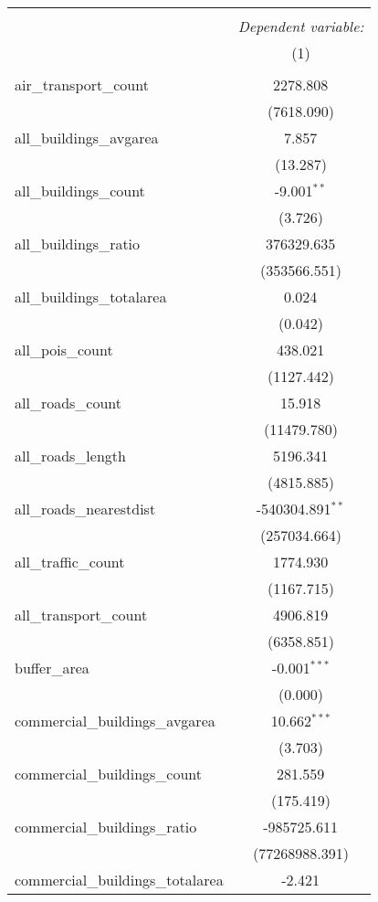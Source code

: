 \begin{table}[!htbp] \centering
\begin{tabular}{@{\extracolsep{5pt}}lc}
\\[-1.8ex]\hline
\hline \\[-1.8ex]
& \multicolumn{1}{c}{\textit{Dependent variable:}} \
\cr \cline{1-2}
\\[-1.8ex] & (1) \\
\hline \\[-1.8ex]
 air_transport_count & 2278.808$^{}$ \\
  & (7618.090) \\
 all_buildings_avgarea & 7.857$^{}$ \\
  & (13.287) \\
 all_buildings_count & -9.001$^{**}$ \\
  & (3.726) \\
 all_buildings_ratio & 376329.635$^{}$ \\
  & (353566.551) \\
 all_buildings_totalarea & 0.024$^{}$ \\
  & (0.042) \\
 all_pois_count & 438.021$^{}$ \\
  & (1127.442) \\
 all_roads_count & 15.918$^{}$ \\
  & (11479.780) \\
 all_roads_length & 5196.341$^{}$ \\
  & (4815.885) \\
 all_roads_nearestdist & -540304.891$^{**}$ \\
  & (257034.664) \\
 all_traffic_count & 1774.930$^{}$ \\
  & (1167.715) \\
 all_transport_count & 4906.819$^{}$ \\
  & (6358.851) \\
 buffer_area & -0.001$^{***}$ \\
  & (0.000) \\
 commercial_buildings_avgarea & 10.662$^{***}$ \\
  & (3.703) \\
 commercial_buildings_count & 281.559$^{}$ \\
  & (175.419) \\
 commercial_buildings_ratio & -985725.611$^{}$ \\
  & (77268988.391) \\
 commercial_buildings_totalarea & -2.421$^{}$ \\

\end{tabular}
\end{table}
